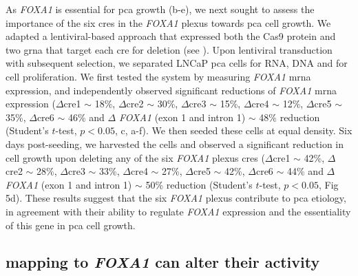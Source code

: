 As \emph{FOXA1} is essential for \gls{pca} growth (b-e), we next sought to assess the importance of the six \glspl{cre} in the \emph{FOXA1} plexus towards \gls{pca} cell growth.
We adapted a lentiviral-based approach that expressed both the Cas9 protein and two \gls{grna} that target each \gls{cre} for deletion (see ).
Upon lentiviral transduction with subsequent selection, we separated LNCaP \gls{pca} cells for RNA, DNA and for cell proliferation.
We first tested the system by measuring \emph{FOXA1} \gls{mrna} expression, and independently observed significant reductions of \emph{FOXA1} \gls{mrna} expression ($\Delta$\gls{cre}1 $\sim$ 18\%, $\Delta$\gls{cre}2 $\sim$ 30\%, $\Delta$\gls{cre}3 $\sim$ 15\%, $\Delta$\gls{cre}4 $\sim$ 12\%, $\Delta$\gls{cre}5 $\sim$ 35\%, $\Delta$\gls{cre}6 $\sim$ 46\% and $\Delta$ \emph{FOXA1} (exon 1 and intron 1) $\sim$ 48\% reduction (Student's $t$-test, $p<0.05$, c, a-f).
We then seeded these cells at equal density.
Six days post-seeding, we harvested the cells and observed a significant reduction in cell growth upon deleting any of the six \emph{FOXA1} plexus \glspl{cre} ($\Delta$\gls{cre}1 $\sim$ 42\%, $\Delta$\gls{cre}2 $\sim$ 28\%, $\Delta$\gls{cre}3 $\sim$ 33\%, $\Delta$\gls{cre}4 $\sim$ 27\%, $\Delta$\gls{cre}5 $\sim$ 42\%, $\Delta$\gls{cre}6 $\sim$ 44\% and $\Delta$ \emph{FOXA1} (exon 1 and intron 1) $\sim$ 50\% reduction (Student's $t$-test, $p<0.05$, Fig 5d).
These results suggest that the six \emph{FOXA1} plexus contribute to \gls{pca} etiology, in agreement with their ability to regulate \emph{FOXA1} expression and the essentiality of this gene in \gls{pca} cell growth.

\subsection{ mapping to \emph{FOXA1}  can alter their activity}

